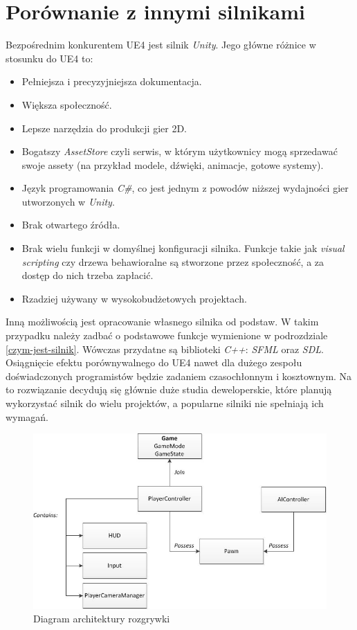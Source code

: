 \documentclass[multip]{SGGW-thesis}
\begin{document}
\section{Porównanie z innymi silnikami}
Bezpośrednim konkurentem UE4 jest silnik {\em Unity}. Jego główne różnice w stosunku do UE4 to:
\begin{itemize}
\item Pełniejsza i precyzyjniejsza dokumentacja.
\item Większa społeczność.
\item Lepsze narzędzia do produkcji gier 2D.
\item Bogatszy {\em AssetStore} czyli serwis, w którym użytkownicy mogą sprzedawać swoje assety (na przykład modele, dźwięki, animacje, gotowe systemy).
\item Język programowania {\em C\#}, co jest jednym z powodów niższej wydajności gier utworzonych w {\em Unity}.
\item Brak otwartego źródła.
\item Brak wielu funkcji w domyślnej konfiguracji silnika. Funkcje takie jak {\em visual scripting} czy drzewa behawioralne są stworzone przez społeczność, a za dostęp do nich trzeba zapłacić.
\item Rzadziej używany w wysokobudżetowych projektach.
\end{itemize}
Inną możliwością jest opracowanie własnego silnika od podstaw. W takim przypadku należy zadbać o podstawowe funkcje wymienione w podrozdziale \ref{czym-jest-silnik}. Wówczas przydatne są biblioteki {\em C++}: {\em SFML} oraz {\em SDL}. Osiągnięcie efektu porównywalnego do UE4 nawet dla dużego zespołu doświadczonych programistów będzie zadaniem czasochłonnym i kosztownym. Na to rozwiązanie decydują się głównie duże studia deweloperskie, które planują wykorzystać silnik do wielu projektów, a popularne silniki nie spełniają ich wymagań.

\begin{figure}
	\centering
		\includegraphics[width=1\textwidth]{figures/gameplay_chart.jpg}
	\caption{Diagram architektury rozgrywki}
	\label{fig-gameplay-chart}
\end{figure}
\end{document}
